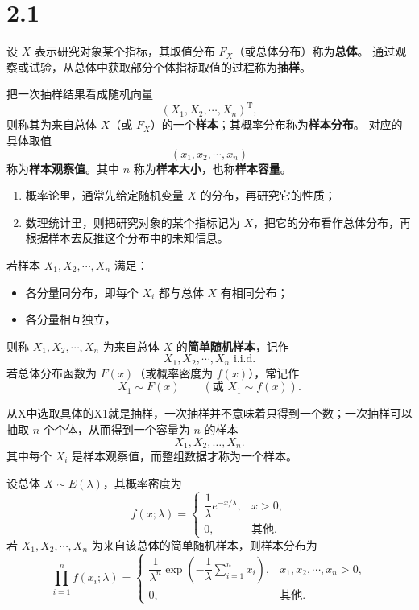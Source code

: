 \section*{2.1}
\begin{definition}[总体、样本与抽样]
设 \(X\) 表示研究对象某个指标，其取值分布 \(F_X\)（或总体分布）称为\textbf{总体}。  
通过观察或试验，从总体中获取部分个体指标取值的过程称为\textbf{抽样}。

把一次抽样结果看成随机向量
\[
(X_1,X_2,\cdots,X_n)^{\mathrm T},
\]
则称其为来自总体 \(X\)（或 \(F_X\)）的一个\textbf{样本}；其概率分布称为\textbf{样本分布}。  
对应的具体取值
\[
(x_1,x_2,\cdots,x_n)
\]
称为\textbf{样本观察值}。其中 \(n\) 称为\textbf{样本大小}，也称\textbf{样本容量}。
\end{definition}
\begin{dxtips}[概率论里面学的都是总体]
  
\begin{enumerate}
    \item 概率论里，通常先给定随机变量 \(X\) 的分布，再研究它的性质；
    \item 数理统计里，则把研究对象的某个指标记为 \(X\)，把它的分布看作总体分布，再根据样本去反推这个分布中的未知信息。
\end{enumerate}

\end{dxtips}
\begin{definition}[简单随机样本]
若样本 \(X_1,X_2,\cdots,X_n\) 满足：
\begin{itemize}
    \item 各分量同分布，即每个 \(X_i\) 都与总体 \(X\) 有相同分布；
    \item 各分量相互独立，
\end{itemize}
则称 \(X_1,X_2,\cdots,X_n\) 为来自总体 \(X\) 的\textbf{简单随机样本}，记作
\[
X_1,X_2,\cdots,X_n \text{ i.i.d.}
\]
若总体分布函数为 \(F(x)\)（或概率密度为 \(f(x)\)），常记作
\[
X_1\sim F(x)\qquad (\text{或 }X_1\sim f(x)).
\]
\end{definition}
\begin{dxtips}
    从X中选取具体的X1就是抽样，一次抽样并不意味着只得到一个数；一次抽样可以抽取 \(n\) 个个体，从而得到一个容量为 \(n\) 的样本
\[
X_1,X_2,\dots,X_n.
\]
其中每个 \(X_i\) 是样本观察值，而整组数据才称为一个样本。
\end{dxtips}
\begin{example}
设总体 \(X\sim E(\lambda)\)，其概率密度为
\[
f(x;\lambda)=
\begin{cases}
\dfrac{1}{\lambda}e^{-x/\lambda}, & x>0,\\[0.5em]
0, & \text{其他}.
\end{cases}
\]
若 \(X_1,X_2,\cdots,X_n\) 为来自该总体的简单随机样本，则样本分布为
\[
\prod_{i=1}^n f(x_i;\lambda)
=
\begin{cases}
\dfrac{1}{\lambda^n}\exp\!\left(-\dfrac{1}{\lambda}\sum_{i=1}^n x_i\right), & x_1,x_2,\cdots,x_n>0,\\[0.8em]
0, & \text{其他}.
\end{cases}
\]
\end{example}

